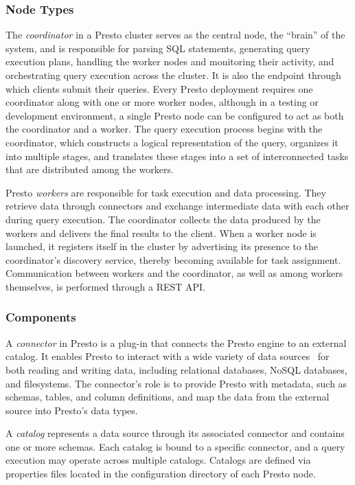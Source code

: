 \documentclass[conference]{IEEEtran}
\begin{document}
\subsubsection{Node Types}

The \textit{coordinator} in a Presto cluster serves as the central node, the “brain” of the system, and is responsible for parsing SQL statements, generating query execution plans, handling the worker nodes and monitoring their activity, and orchestrating query execution across the cluster. It is also the endpoint through which clients submit their queries. Every Presto deployment requires one coordinator along with one or more worker nodes, although in a testing or development environment, a single Presto node can be configured to act as both the coordinator and a worker. The query execution process begins with the coordinator, which constructs a logical representation of the query, organizes it into multiple stages, and translates these stages into a set of interconnected tasks that are distributed among the workers.

Presto \textit{workers} are responsible for task execution and data processing. They retrieve data through connectors and exchange intermediate data with each other during query execution. The coordinator collects the data produced by the workers and delivers the final results to the client. When a worker node is launched, it registers itself in the cluster by advertising its presence to the coordinator’s discovery service, thereby becoming available for task assignment. Communication between workers and the coordinator, as well as among workers themselves, is performed through a REST API.


\subsubsection{Components}

A \textit{connector} in Presto is a plug-in that connects the Presto engine to an external catalog. It enables Presto to interact with a wide variety of data sources  for both reading and writing data, including relational databases, NoSQL databases, and filesystems. The connector’s role is to provide Presto with metadata, such as schemas, tables, and column definitions, and map the data from the external source into Presto’s data types. \cite{b4}

A \textit{catalog} represents a data source through its associated connector and contains one or more schemas. Each catalog is bound to a specific connector, and a query execution may operate across multiple catalogs. Catalogs are defined via properties files located in the configuration directory of each Presto node.
\end{document}
